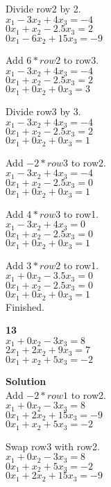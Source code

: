 \documentclass{article}
\begin{document}
Divide row2 by 2.\\
$x_{1} - 3x_{2} + 4x_{3} = -4$\\
$0x_{1} + x_{2} - 2.5x_{3} = 2$\\
$0x_{1} - 6x_{2} + 15x_{3} = -9$

Add $6*row2$ to row3.\\
$x_{1} - 3x_{2} + 4x_{3} = -4$\\
$0x_{1} + x_{2} - 2.5x_{3} = 2$\\
$0x_{1} + 0x_{2} + 0x_{3} = 3$

Divide row3 by 3.\\
$x_{1} - 3x_{2} + 4x_{3} = -4$\\
$0x_{1} + x_{2} - 2.5x_{3} = 2$\\
$0x_{1} + 0x_{2} + 0x_{3} = 1$

Add $-2*row3$ to row2.\\
$x_{1} - 3x_{2} + 4x_{3} = -4$\\
$0x_{1} + x_{2} - 2.5x_{3} = 0$\\
$0x_{1} + 0x_{2} + 0x_{3} = 1$

Add $4*row3$ to row1.\\
$x_{1} - 3x_{2} + 4x_{3} = 0$\\
$0x_{1} + x_{2} - 2.5x_{3} = 0$\\
$0x_{1} + 0x_{2} + 0x_{3} = 1$

Add $3*row2$ to row1.\\
$x_{1} + 0x_{2} - 3.5x_{3} = 0$\\
$0x_{1} + x_{2} - 2.5x_{3} = 0$\\
$0x_{1} + 0x_{2} + 0x_{3} = 1$
\\Finished.

\textbf{13}\\
$x_{1} + 0x_{2} - 3x_{3} = 8$\\
$2x_{1} + 2x_{2} + 9x_{3} = 7$\\
$0x_{1} + x_{2} + 5x_{3} = -2$

\textbf{Solution}\\
Add $-2*row1$ to row2.\\
$x_{1} + 0x_{2} - 3x_{3} = 8$\\
$0x_{1} + 2x_{2} + 15x_{3} = -9$\\
$0x_{1} + x_{2} + 5x_{3} = -2$

Swap row3 with row2.\\
$x_{1} + 0x_{2} - 3x_{3} = 8$\\
$0x_{1} + x_{2} + 5x_{3} = -2$\\
$0x_{1} + 2x_{2} + 15x_{3} = -9$
\end{document}
